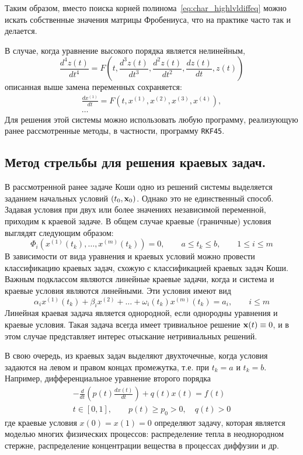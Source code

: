 \documentclass[../../calc-math-exam-2023.tex]{subfiles}
\begin{document}
    Таким образом, вместо поиска корней полинома~\eqref{eq:char_highlvldiffeq} можно искать собственные значения
    матрицы Фробениуса, что на практике часто так и делается.

    В случае, когда уравнение высокого порядка является нелинейным,
    \begin{equation*}
        \frac{d^4 z(t)}{dt^4} = F\left( t, \frac{d^3 z(t)}{dt^3}, \frac{d^2 z(t)}{dt^2}, \frac{dz(t)}{dt}, z(t) \right)
    \end{equation*}
    описанная выше замена переменных сохраняется:
    \begin{gather*}
        \frac{dx^{(1)}}{dt} = F\left( t, x^{(1)}, x^{(2)}, x^{(3)}, x^{(4)} \right), \\
        \dots
    \end{gather*}
    Для решения этой системы можно использовать любую программу, реализующую ранее рассмотренные методы, в частности,
    программу \verb|RKF45|.

    \subsection{Метод стрельбы для решения краевых задач.}
    В рассмотренной ранее задаче Коши одно из решений системы выделяется заданием начальных условий $(t_0, \bf{x}_0)$.
    Однако это не единственный способ. Задавая условия при двух или более значениях независимой переменной, приходим к
    краевой задаче. В общем случае краевые (граничные) условия выглядят следующим образом:
    \begin{equation*}
        \Phi_i \left( x^{(1)}(t_k),\ldots, x^{(m)}(t_k) \right) = 0, \qquad a \leq t_k \leq b, \qquad 1 \leq i \leq m
    \end{equation*}
    В зависимости от вида уравнения и краевых условий можно провести классификацию краевых задач, схожую с классификацией
    краевых задач Коши. Важным подклассом являются линейные краевые задачи, когда и система и краевые условия являются
    линейными. Эти условия имеют вид
    \begin{equation*}
        \alpha_i x^{(1)}(t_k) + \beta_i x^{(2)} + \ldots + \omega_i(t_k)x^{(m)}(t_k) = a_i, \qquad i \leq m
    \end{equation*}
    Линейная краевая задача является однородной, если однородны уравнения и краевые условия. Такая задача всегда имеет
    тривиальное решение $\bf{x}(t) \equiv 0$, и в этом случае представляет интерес отыскание нетривиальных решений.

    В свою очередь, из краевых задач выделяют двухточечные, когда условия задаются на левом и правом концах промежутка,
    т.е. при $t_k = a$ и $t_k = b$. Например, дифференциальное уравнение второго порядка
    \begin{gather*}
        -\frac{d}{dt} \left( p(t)\frac{dx(t)}{dt} \right) + q(t)x(t) = f(t)\\
        t \in [0, 1], \qquad p(t) \geq p_0 > 0, \quad q(t) > 0
    \end{gather*}
    где краевые условия $x(0) = x(1) = 0$ определяют задачу, которая является моделью многих физических процессов:
    распределение тепла в неоднородном стержне, распределение концентрации вещества в процессах диффузии и др.
\end{document}
